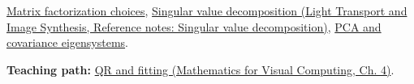 \hyperref[appendix-221a483bec2d]{Matrix factorization choices}, \href{../04-Light-Transport-and-Image-Synthesis/main.pdf\#nameddest=appendix-1fad5e7f36fa}{Singular value decomposition (Light Transport and Image Synthesis, Reference notes: Singular value decomposition)}, \hyperref[appendix-ad175ef3c5bf]{PCA and covariance eigensystems}.

\textbf{Teaching path:} \href{../02-Mathematics-for-Visual-Computing/main.pdf\#nameddest=01-foundations-i-ch020-structure-makes-a-decomposition-a-better-tool-than-generic-elimination}{QR and fitting (Mathematics for Visual Computing, Ch. 4)}.
